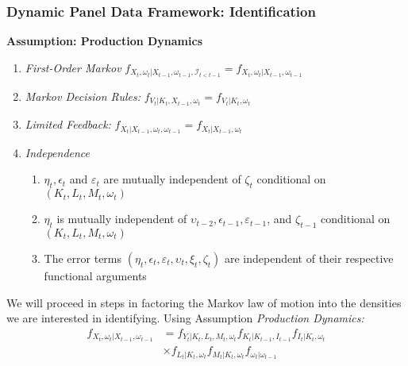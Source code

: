 \documentclass{beamer}
\begin{document}

\begin{frame}
\frametitle{Dynamic Panel Data Framework: Identification}
\textbf{Assumption: Production Dynamics}
\begin{enumerate}
	\item \textit{First-Order Markov} $f_{X_{t}, \omega_{t}|X_{t-1}, \omega_{t-1}, \mathcal{I}_{t<t-1}}=f_{X_{t}, \omega_{t}|X_{t-1}, \omega_{t-1}}$
	\item \textit{Markov Decision Rules:} $f_{V_{t}|K_{t}, X_{t-1}, \omega_{t}}=f_{V_{t}|K_{t}, \omega_{t}}$
	\item \textit{Limited Feedback:} $f_{X_{t}|X_{t-1}, \omega_{t}, \omega_{t-1}}=f_{X_{t}|X_{t-1}, \omega_{t}}$
	\item \textit{Independence}
		\begin{enumerate}
		    \item $\eta_{t}, \epsilon_{t}$ and $\varepsilon_{t}$ are mutually independent of $\zeta_{t}$ conditional on $(K_{t}, L_{t}, M_{t}, \omega_{t})$
		    \item $\eta_{t}$ is mutually independent of $\upsilon_{t-2}, \epsilon_{t-1}, \varepsilon_{t-1}$, and $\zeta_{t-1}$ conditional on $(K_{t}, L_{t}, M_{t}, \omega_{t})$
		    \item The error terms $(\eta_{t}, \epsilon_{t}, \varepsilon_{t}, \upsilon_{t}, \xi_{t}, \zeta_{t})$ are independent of their respective functional arguments
		\end{enumerate}
\end{enumerate}
We will proceed in steps in factoring the Markov law of motion into the densities we are interested in identifying. Using Assumption \textit{Production Dynamics:}
\begin{equation} \label{motion}
    \begin{split}
        f_{X_{t}, \omega_{t}|X_{t-1}, \omega_{t-1}}&=f_{Y_{t}|K_{t}, L_{t}, M_{t}, \omega_{t}}f_{K_{t}|K_{t-1}, I_{t-1}}f_{I_{t}|K_{t}, \omega_{t}}\\
        &\times f_{L_{t}|K_{t}, \omega_{t}}f_{M_{t}|K_{t}, \omega_{t}}f_{\omega_{t}|\omega_{t-1}}
    \end{split}
\end{equation} 
\end{frame}

\end{document}
